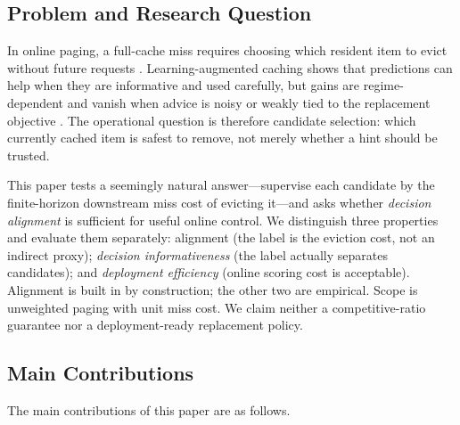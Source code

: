 \documentclass[preprint,12pt]{elsarticle}
\begin{document}
\subsection{Problem and Research Question}
\label{subsec:problem_motivation}
\label{subsec:objective_scope}

In online paging, a full-cache miss requires choosing which resident item to evict without future requests \cite{belady1966replacement_algorithms,fiat1991competitive_paging}. Learning-augmented caching shows that predictions can help when they are informative and used carefully, but gains are regime-dependent and vanish when advice is noisy or weakly tied to the replacement objective \cite{lykouris2021competitive_caching,antoniadis2020online_metric_untrusted,im2022parsimonious_lac,wei2020better_simpler_lac,chledowski2021robust_lac_experimental,mitzenmacher2022algorithms_predictions}. The operational question is therefore candidate selection: which currently cached item is safest to remove, not merely whether a hint should be trusted.

This paper tests a seemingly natural answer---supervise each candidate by the finite-horizon downstream miss cost of evicting it---and asks whether \emph{decision alignment} is sufficient for useful online control. We distinguish three properties and evaluate them separately: alignment (the label is the eviction cost, not an indirect proxy); \emph{decision informativeness} (the label actually separates candidates); and \emph{deployment efficiency} (online scoring cost is acceptable). Alignment is built in by construction; the other two are empirical. Scope is unweighted paging with unit miss cost. We claim neither a competitive-ratio guarantee nor a deployment-ready replacement policy.

\subsection{Main Contributions}
\label{subsec:main_contributions}

The main contributions of this paper are as follows.
\end{document}
